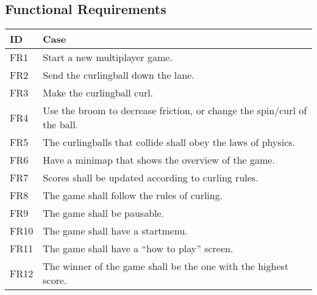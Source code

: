 \subsection{Functional Requirements}

\begin{center}
    \begin{tabular}{ | l | p{12cm} |}
    \hline
	\textbf{ID} & \textbf{Case} \\ \hline
	FR1 & Start a new multiplayer game.\\ \hline 
	FR2 & Send the curlingball down the lane.\\ \hline 
	FR3 & Make the curlingball curl. \\ \hline 
	FR4 & Use the broom to decrease friction, or change the spin/curl of the ball.\\ \hline 
	FR5 & The curlingballs that collide shall obey the laws of physics. \\ \hline 
	FR6 & Have a minimap that shows the overview of the game.\\ \hline 
	FR7 & Scores shall be updated according to curling rules.\\ \hline 
	FR8 & The game shall follow the rules of curling.\\ \hline 
	FR9 & The game shall be pausable.\\ \hline 
	FR10 & The game shall have a startmenu.\\ \hline 
	FR11 & The game shall have a “how to play” screen.\\ \hline 
	FR12 & The winner of the game shall be the one with the highest score. \\ \hline

    \hline
    \end{tabular}
\end{center}